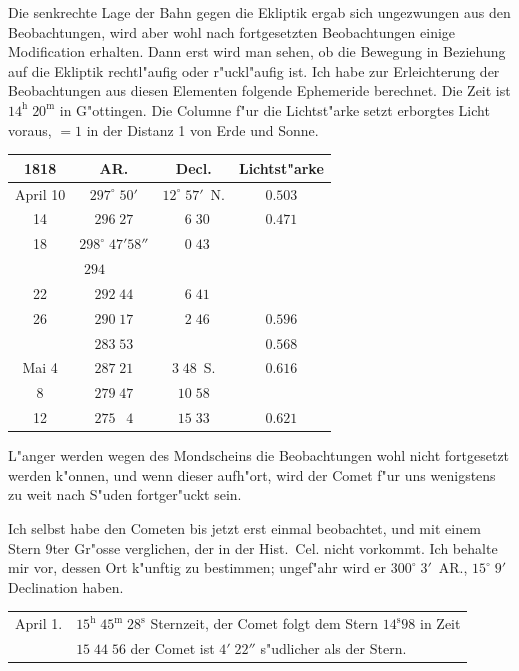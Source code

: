 \documentclass[12pt,a4paper]{article}
\begin{document}
Die senkrechte Lage der Bahn gegen die Ekliptik ergab sich ungezwungen aus den Beobachtungen,
wird aber wohl nach fortgesetzten Beobachtungen einige Modification erhalten. Dann erst wird man
sehen, ob die Bewegung in Beziehung auf die Ekliptik rechtl"aufig oder r"uckl"aufig ist. Ich habe zur
Erleichterung der Beobachtungen aus diesen Elementen folgende Ephemeride berechnet. Die Zeit ist
$14^{\mathrm{h}}\;20^{\mathrm{m}}$ in G"ottingen. Die Columne f"ur die Lichtst"arke setzt erborgtes Licht voraus, $=1$ in der
Distanz 1 von Erde und Sonne.

\begin{center}
\small
\begin{tabular}{c|c|c|c}
\toprule
1818 & AR. & Decl. & Lichtst"arke \\
\midrule
April 10 & $297^{\circ}\;50'$ & $12^{\circ}\;57'$~N. & $0.503$ \\
\phantom{10} 14 & $296\;27$ & $\phantom{0}6\;30$ & $0.471$ \\
\phantom{10} 18 & $298^{\circ}\;47'58''$ & $\phantom{0}0\;43$ & \\
\phantom{10} & $294\;\phantom{0}\phantom{0}\phantom{0}\phantom{0}\phantom{0}$ & & \\
\phantom{10} 22 & $292\;44$ & $\phantom{0}6\;41$ & \\
\phantom{10} 26 & $290\;17$ & $\phantom{0}2\;46$ & $0.596$ \\
& $283\;53$ & & $0.568$ \\
Mai \phantom{0}4 & $287\;21$ & $3\;48$~S. & $0.616$ \\
\phantom{0}\phantom{0} \phantom{0}8 & $279\;47$ & $10\;58$ & \\
\phantom{0}\phantom{0} 12 & $275\;\phantom{0}4$ & $15\;33$ & $0.621$ \\
\bottomrule
\end{tabular}
\end{center}

L"anger werden wegen des Mondscheins die Beobachtungen wohl nicht fortgesetzt werden k"onnen,
und wenn dieser aufh"ort, wird der Comet f"ur uns wenigstens zu weit nach S"uden fortger"uckt sein.

Ich selbst habe den Cometen bis jetzt erst einmal beobachtet, und mit einem Stern 9ter Gr"osse
verglichen, der in der Hist.~C\kern-0.5pt{}el. nicht vorkommt. Ich behalte mir vor, dessen Ort k"unftig zu bestimmen;
ungef"ahr wird er $300^{\circ}\;3'$~AR., $15^{\circ}\;9'$ Declination haben.

\begin{center}
\begin{tabular}{l@{\quad}l}
April 1. & $15^{\mathrm{h}}\;45^{\mathrm{m}}\;28^{\mathrm{s}}$ Sternzeit, der Comet folgt dem Stern $14^{\mathrm{s}}98$ in Zeit \\
& $15\;44\;56$ \phantom{Sternzeit,} der Comet ist $4'\;22''$ s"udlicher als der Stern.
\end{tabular}
\end{center}
\end{document}
